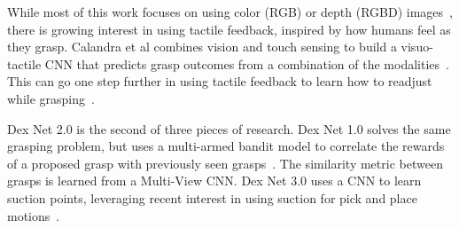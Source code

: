 While most of this work focuses on using color (RGB) or depth (RGBD) images~\cite{lenz2015deep}, there is growing interest in using tactile feedback, inspired by how humans feel as they grasp. 
Calandra et al combines vision and touch sensing to build a visuo-tactile CNN that predicts grasp outcomes from a combination of the modalities~\cite{calandra2017feeling}. 
This can go one step further in using tactile feedback to learn how to readjust while grasping~\cite{chebotar2016self}. 

Dex Net 2.0 is the second of three pieces of research. 
Dex Net 1.0 solves the same grasping problem, but uses a multi-armed bandit model to correlate the rewards of a proposed grasp with previously seen grasps~\cite{mahler2016dex}.
The similarity metric between grasps is learned from a Multi-View CNN. 
Dex Net 3.0 uses a CNN to learn suction points, leveraging recent interest in using suction for pick and place motions~\cite{mahler2017suction}. 

